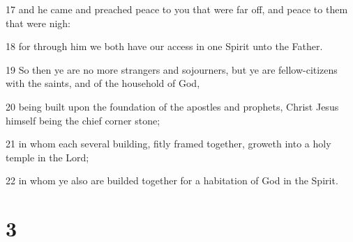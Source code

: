\par 17 and he came and preached peace to you that were far off, and peace to them that were nigh:
\par 18 for through him we both have our access in one Spirit unto the Father.
\par 19 So then ye are no more strangers and sojourners, but ye are fellow-citizens with the saints, and of the household of God,
\par 20 being built upon the foundation of the apostles and prophets, Christ Jesus himself being the chief corner stone;
\par 21 in whom each several building, fitly framed together, groweth into a holy temple in the Lord;
\par 22 in whom ye also are builded together for a habitation of God in the Spirit.

\chapter{3}

